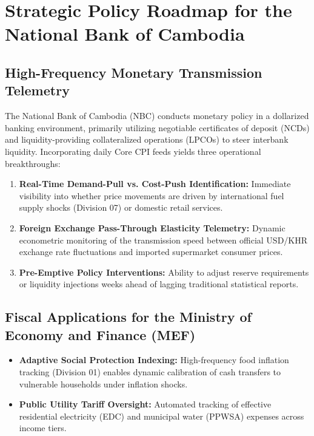 \documentclass[11pt,a4paper,oneside]{article}
\begin{document}
\section{Strategic Policy Roadmap for the National Bank of Cambodia}

\subsection{High-Frequency Monetary Transmission Telemetry}
The National Bank of Cambodia (NBC) conducts monetary policy in a dollarized banking environment, primarily utilizing negotiable certificates of deposit (NCDs) and liquidity-providing collateralized operations (LPCOs) to steer interbank liquidity. Incorporating daily Core CPI feeds yields three operational breakthroughs:
\begin{enumerate}
    \item \textbf{Real-Time Demand-Pull vs. Cost-Push Identification:} Immediate visibility into whether price movements are driven by international fuel supply shocks (Division 07) or domestic retail services.
    \item \textbf{Foreign Exchange Pass-Through Elasticity Telemetry:} Dynamic econometric monitoring of the transmission speed between official USD/KHR exchange rate fluctuations and imported supermarket consumer prices.
    \item \textbf{Pre-Emptive Policy Interventions:} Ability to adjust reserve requirements or liquidity injections weeks ahead of lagging traditional statistical reports.
\end{enumerate}

\subsection{Fiscal Applications for the Ministry of Economy and Finance (MEF)}
\begin{itemize}[noitemsep]
    \item \textbf{Adaptive Social Protection Indexing:} High-frequency food inflation tracking (Division 01) enables dynamic calibration of cash transfers to vulnerable households under inflation shocks.
    \item \textbf{Public Utility Tariff Oversight:} Automated tracking of effective residential electricity (EDC) and municipal water (PPWSA) expenses across income tiers.
\end{itemize}
\end{document}
